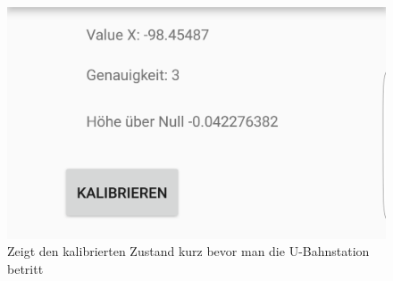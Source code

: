 \documentclass{article}
\begin{document}
\begin{figure}[H]
	\centering
	\includegraphics[scale=0.18]{images/app_pic2_calibration.png}
	\caption{Zeigt den kalibrierten Zustand kurz bevor man die U-Bahnstation betritt}
	\label{fig:app_pic2_calibration.png}
\end{figure}
\end{document}
